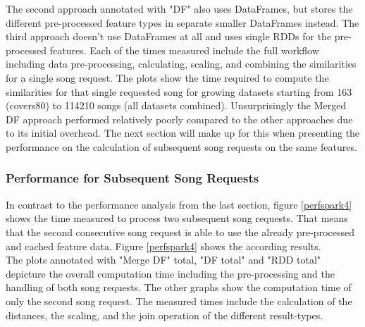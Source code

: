 \noindent The second approach annotated with "DF" also uses DataFrames, but stores the different pre-processed feature types in separate smaller DataFrames instead. The third approach doesn't use DataFrames at all and uses single RDDs for the pre-processed features. Each of the times measured include the full workflow including data pre-processing, calculating, scaling, and combining the similarities for a single song request. The plots show the time required to compute the similarities for that single requested song for growing datasets starting from 163 (covers80) to 114210 songs (all datasets combined). 
\noindent Unsurprisingly the Merged DF approach performed relatively poorly compared to the other approaches due to its initial overhead. The next section will make up for this when presenting the performance on the calculation of subsequent song requests on the same features.

\subsubsection{Performance for Subsequent Song Requests}

In contrast to the performance analysis from the last section, figure \ref{perfspark4} shows the time measured to process two subsequent song requests. That means that the second consecutive song request is able to use the already pre-processed and cached feature data. Figure \ref{perfspark4} shows the according results.\\
\noindent The plots annotated with "Merge DF" total, "DF total" and "RDD total" depicture the overall computation time including the pre-processing and the handling of both song requests. The other graphs show the computation time of only the second song request. The measured times include the calculation of the distances, the scaling, and the join operation of the different result-types.

